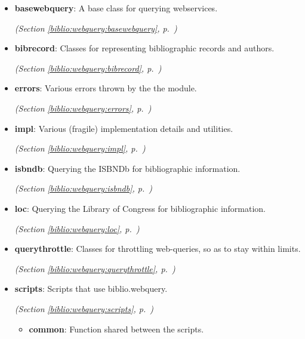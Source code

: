 \begin{itemize}
\setlength{\parskip}{0ex}
\item \textbf{basewebquery}: 
A base class for querying webservices.


  \textit{(Section \ref{biblio:webquery:basewebquery}, p.~\pageref{biblio:webquery:basewebquery})}

\item \textbf{bibrecord}: 
Classes for representing bibliographic records and authors.


  \textit{(Section \ref{biblio:webquery:bibrecord}, p.~\pageref{biblio:webquery:bibrecord})}

\item \textbf{errors}: 
Various errors thrown by the the module.


  \textit{(Section \ref{biblio:webquery:errors}, p.~\pageref{biblio:webquery:errors})}

\item \textbf{impl}: 
Various (fragile) implementation details and utilities.


  \textit{(Section \ref{biblio:webquery:impl}, p.~\pageref{biblio:webquery:impl})}

\item \textbf{isbndb}: 
Querying the ISBNDb for bibliographic information.


  \textit{(Section \ref{biblio:webquery:isbndb}, p.~\pageref{biblio:webquery:isbndb})}

\item \textbf{loc}: 
Querying the Library of Congress for bibliographic information.


  \textit{(Section \ref{biblio:webquery:loc}, p.~\pageref{biblio:webquery:loc})}

\item \textbf{querythrottle}: 
Classes for throttling web-queries, so as to stay within limits.


  \textit{(Section \ref{biblio:webquery:querythrottle}, p.~\pageref{biblio:webquery:querythrottle})}

\item \textbf{scripts}: 
Scripts that use biblio.webquery.


  \textit{(Section \ref{biblio:webquery:scripts}, p.~\pageref{biblio:webquery:scripts})}

  \begin{itemize}
\setlength{\parskip}{0ex}
    \item \textbf{common}: 
Function shared between the scripts.



\end{itemize}
\end{itemize}
